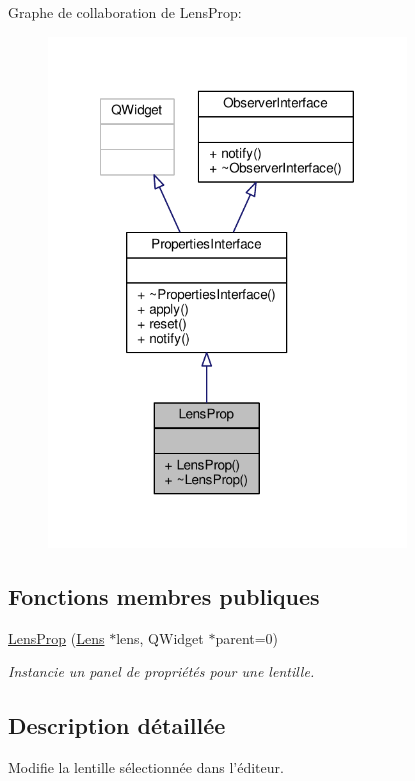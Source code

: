 Graphe de collaboration de Lens\+Prop\+:
\nopagebreak
\begin{figure}[H]
\begin{center}
\leavevmode
\includegraphics[width=269pt]{de/d14/classLensProp__coll__graph}
\end{center}
\end{figure}
\subsection*{Fonctions membres publiques}
\begin{DoxyCompactItemize}
\item 
\hyperlink{classLensProp_a2a9f54d768d72f8ad69e1572259d2a85}{Lens\+Prop} (\hyperlink{classLens}{Lens} $\ast$lens, Q\+Widget $\ast$parent=0)
\begin{DoxyCompactList}\small\item\em Instancie un panel de propriétés pour une lentille. \end{DoxyCompactList}\end{DoxyCompactItemize}


\subsection{Description détaillée}
Modifie la lentille sélectionnée dans l’éditeur. 

